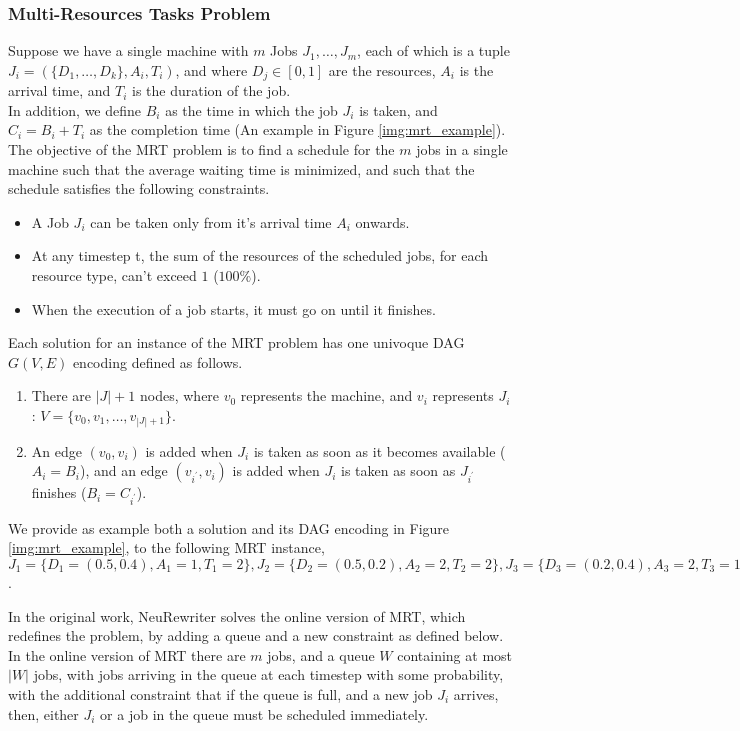 \documentclass[12pt]{article}
\begin{document}
\medbreak
\subsubsection{Multi-Resources Tasks Problem}
Suppose we have a single machine with $m$ Jobs $J_1,\dots,J_m$, each of which is a tuple $J_i = (\{D_1,\dots,D_k\}, A_i, T_i)$, and where $D_j \in [0,1]$ are the resources, $A_i$ is the arrival time, and $T_i$ is the duration of the job.\\
In addition, we define $B_i$ as the time in which the job $J_i$ is taken, and $C_i = B_i + T_i$ as the completion time \cite{neu_rewriter} (An example in Figure \ref{img:mrt_example}).\\
The objective of the MRT problem is to find a schedule for the $m$ jobs in a single machine such that the average waiting time is minimized, and such that the schedule satisfies the following constraints.
\begin{itemize}
    \item A Job $J_i$ can be taken only from it's arrival time $A_i$ onwards.
    \item At any timestep t, the sum of the resources of the scheduled jobs, for each resource type, can't exceed $1$ ($100\%$).
    \item When the execution of a job starts, it must go on until it finishes.
\end{itemize}
Each solution for an instance of the MRT problem has one univoque DAG $G(V,E)$ encoding defined as follows.
\begin{enumerate}
    \item There are $|J|+1$ nodes, where $v_0$ represents the machine, and $v_i$ represents $J_i$: $V=\{v_0,v_1,\dots,v_{|J|+1}\}$.
    \item An edge $(v_0,v_i)$ is added when $J_i$ is taken as soon as it becomes available ($A_i=B_i$), and an edge $(v_{i^{'}},v_i)$ is added when $J_i$ is taken as soon as $J_{i^{'}}$ finishes ($B_i = C_{i^{'}}$).
\end{enumerate}
We provide as example both a solution and its DAG encoding in Figure \ref{img:mrt_example}, to the following MRT instance, $J_1 = \{D_1=(0.5,0.4),A_1=1,T_1=2\}, J_2 = \{D_2=(0.5,0.2),A_2=2,T_2=2\}, J_3 = \{D_3=(0.2,0.4),A_3=2,T_3=1\}, J_4 = \{D_4=(0.3,0.4),A_4=1,T_4=3\}, J_5 = \{D_5=(0.5,0.5),A_5=3,T_5=1\}$.

\medbreak
In the original work, NeuRewriter solves the online version of MRT, which redefines the problem, by adding a queue and a new constraint as defined below.\\
In the online version of MRT there are $m$ jobs, and a queue $W$ containing at most $|W|$ jobs, with jobs arriving in the queue at each timestep with some probability, with the additional constraint that if the queue is full, and a new job $J_i$ arrives, then, either $J_i$ or a job in the queue must be scheduled immediately.
\end{document}
